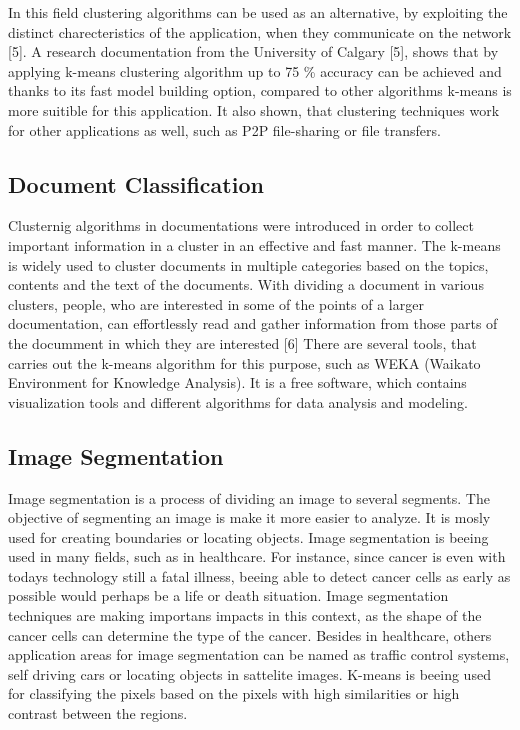 \documentclass[conference]{IEEEtran}
\begin{document}
In this field clustering algorithms can be used as an alternative, by exploiting the distinct charecteristics of the application, when they communicate on the network [5]. A research documentation from the University of Calgary [5], shows that by applying k-means clustering algorithm up to 75 \% accuracy can be achieved and thanks to its fast model building option, compared to other algorithms k-means is more suitible for this application. It also shown, that clustering techniques work for other applications as well, such as P2P file-sharing or file transfers.\\

\subsection{Document Classification}
Clusternig algorithms in documentations were introduced in order to collect important information in a cluster in an effective and fast manner. The k-means is widely used to cluster documents in multiple categories based on the topics, contents and the text of the documents. With dividing a document in various clusters, people, who are interested in some of the points of a larger documentation, can effortlessly read and gather information from those parts of the documment in which they are interested [6] There are several tools, that carries out the k-means algorithm for this purpose, such as WEKA (Waikato Environment for Knowledge Analysis). It is a free software, which contains visualization tools and different algorithms for data analysis and modeling.

\subsection{Image Segmentation}
Image segmentation is a process of dividing an image to several segments. The objective of segmenting an image is make it more easier to analyze. It is mosly used for creating boundaries or locating objects. Image segmentation is beeing used in many fields, such as in healthcare. For instance, since cancer is even with todays technology still a fatal illness, beeing able to detect cancer cells as early as possible would perhaps be a life or death situation. Image segmentation techniques are making importans impacts in this context, as the shape of the cancer cells can determine the type of the cancer. Besides in healthcare, others application areas for image segmentation can be named as traffic control systems, self driving cars or locating objects in sattelite images. K-means is beeing used for classifying the pixels based on the pixels with high similarities or high contrast between the regions.
 
\end{document}
